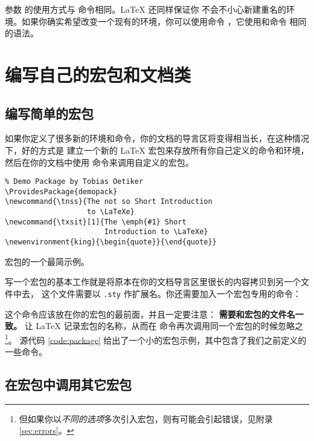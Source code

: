 参数  的使用方式与  命令相同。\LaTeX{} 还同样保证你
不会不小心新建重名的环境。如果你确实希望改变一个现有的环境，你可以使用命令
 ，它使用和命令  相同的语法。

\section{编写自己的宏包和文档类}\label{sec:packages}

\subsection{编写简单的宏包}\label{subsec:provide-pkg}

如果你定义了很多新的环境和命令，你的文档的导言区将变得相当长，在这种情况下，好的方式是
建立一个新的 \LaTeX{} 宏包来存放所有你自己定义的命令和环境，
然后在你的文档中使用  命令来调用自定义的宏包。

\begin{sourcecode}[htp]
\begin{Verbatim}
% Demo Package by Tobias Oetiker
\ProvidesPackage{demopack}
\newcommand{\tnss}{The not so Short Introduction
                   to \LaTeXe}
\newcommand{\txsit}[1]{The \emph{#1} Short
                       Introduction to \LaTeXe}
\newenvironment{king}{\begin{quote}}{\end{quote}}
\end{Verbatim}
\caption{宏包的一个最简示例。}\label{code:package}
\end{sourcecode}

写一个宏包的基本工作就是将原本在你的文档导言区里很长的内容拷贝到另一个文件中去，
 这个文件需要以 \texttt{.sty} 作扩展名。你还需要加入一个宏包专用的命令：
\begin{command}
\end{command}
这个命令应该放在你的宏包的最前面，并且一定要注意：\textbf{ 需要和宏包的文件名一致。}
 让 \LaTeX{} 记录宏包的名称，从而在  命令再次调用同一个宏包的时候忽略之%
\footnote{但如果你以\emph{不同的选项}多次引入宏包，则有可能会引起错误，见附录 \ref{sec:errors}。}。
源代码 \ref{code:package} 给出了一个小的宏包示例，其中包含了我们之前定义的一些命令。

\subsection{在宏包中调用其它宏包}\label{subsec:require-pkg}


